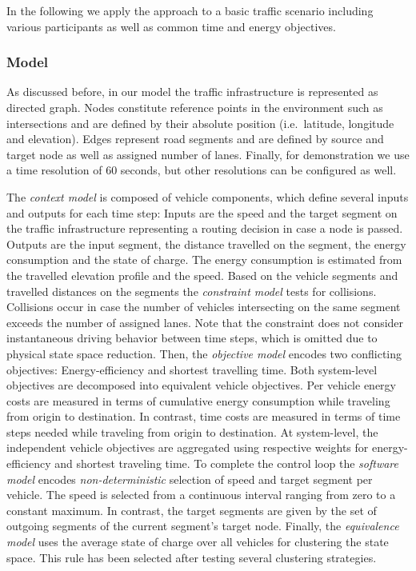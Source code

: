 \documentclass[conference]{../cls/IEEEtran}
\begin{document}
In the following we apply the approach to a basic traffic scenario including various participants as well as common time and energy objectives.

\subsubsection*{Model}

As discussed before, in our model the traffic infrastructure is represented as directed graph. Nodes constitute reference points in the environment such as intersections and are defined by their absolute position (i.e.\ latitude, longitude and elevation). Edges represent road segments and are defined by source and target node as well as assigned number of lanes. Finally, for demonstration we use a time resolution of 60 seconds, but other resolutions can be configured as well.

The \textit{context model} is composed of vehicle components, which define several inputs and outputs for each time step: Inputs are the speed and the target segment on the traffic infrastructure representing a routing decision in case a node is passed. Outputs are the input segment, the distance travelled on the segment, the energy consumption and the state of charge. The energy consumption is estimated from the travelled elevation profile and the speed. Based on the vehicle segments and travelled distances on the segments the \textit{constraint model} tests for collisions. Collisions occur in case the number of vehicles intersecting on the same segment exceeds the number of assigned lanes. Note that the constraint does not consider instantaneous driving behavior between time steps, which is omitted due to physical state space reduction. Then, the \textit{objective model} encodes two conflicting objectives: Energy-efficiency and shortest travelling time. Both system-level objectives are decomposed into equivalent vehicle objectives. Per vehicle energy costs are measured in terms of cumulative energy consumption while traveling from origin to destination. In contrast, time costs are measured in terms of time steps needed while traveling from origin to destination. At system-level, the independent vehicle objectives are aggregated using respective weights for energy-efficiency and shortest traveling time. To complete the control loop the \textit{software model} encodes \textit{non-deterministic} selection of speed and target segment per vehicle. The speed is selected from a continuous interval ranging from zero to a constant maximum. In contrast, the target segments are given by the set of outgoing segments of the current segment's target node. Finally, the \textit{equivalence model} uses the average state of charge over all vehicles for clustering the state space. This rule has been selected after testing several clustering strategies.
\end{document}
